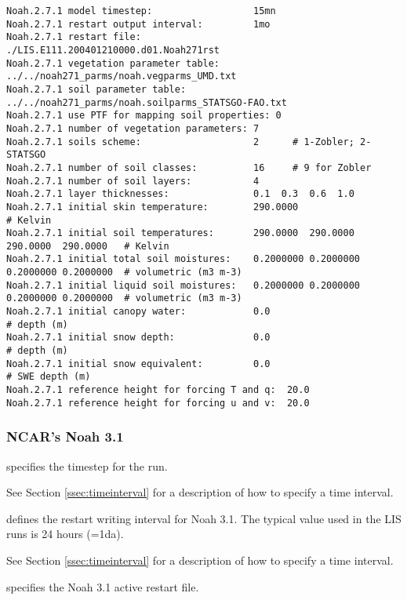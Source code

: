  \begin{Verbatim}[frame=single]
Noah.2.7.1 model timestep:                  15mn
Noah.2.7.1 restart output interval:         1mo
Noah.2.7.1 restart file:                    ./LIS.E111.200401210000.d01.Noah271rst
Noah.2.7.1 vegetation parameter table:      ../../noah271_parms/noah.vegparms_UMD.txt
Noah.2.7.1 soil parameter table:            ../../noah271_parms/noah.soilparms_STATSGO-FAO.txt
Noah.2.7.1 use PTF for mapping soil properties: 0
Noah.2.7.1 number of vegetation parameters: 7
Noah.2.7.1 soils scheme:                    2      # 1-Zobler; 2-STATSGO
Noah.2.7.1 number of soil classes:          16     # 9 for Zobler
Noah.2.7.1 number of soil layers:           4
Noah.2.7.1 layer thicknesses:               0.1  0.3  0.6  1.0
Noah.2.7.1 initial skin temperature:        290.0000                                 # Kelvin
Noah.2.7.1 initial soil temperatures:       290.0000  290.0000  290.0000  290.0000   # Kelvin
Noah.2.7.1 initial total soil moistures:    0.2000000 0.2000000 0.2000000 0.2000000  # volumetric (m3 m-3)
Noah.2.7.1 initial liquid soil moistures:   0.2000000 0.2000000 0.2000000 0.2000000  # volumetric (m3 m-3)
Noah.2.7.1 initial canopy water:            0.0                                      # depth (m)
Noah.2.7.1 initial snow depth:              0.0                                      # depth (m)
Noah.2.7.1 initial snow equivalent:         0.0                                      # SWE depth (m)
Noah.2.7.1 reference height for forcing T and q:  20.0
Noah.2.7.1 reference height for forcing u and v:  20.0
 \end{Verbatim}

 
 
 \subsubsection{NCAR's Noah 3.1} \label{sssec:lsm_noah31}
 

 
  specifies the timestep for the run.

 See Section \ref{ssec:timeinterval} for a description
 of how to specify a time interval.

  defines the restart writing 
 interval for Noah 3.1. The typical value used in the LIS
 runs is 24 hours (=1da).

 See Section \ref{ssec:timeinterval} for a description
 of how to specify a time interval.

  specifies the Noah 3.1 active
 restart file.

